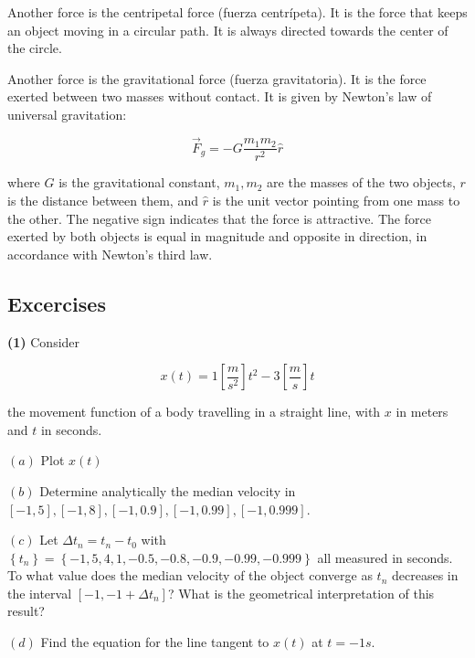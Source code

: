 \documentclass[12pt]{article}
\theoremstyle{definition}
\begin{document}
Another force is the centripetal force (fuerza centrípeta). It is the force
that keeps an object moving in a circular path. It is always directed towards
the center of the circle. 

Another force is the gravitational force (fuerza gravitatoria). 
It is the force exerted between two masses without contact. It is given by
Newton's law of universal gravitation: 

\begin{equation*}
    \vec{F}_g = - G \frac{m_1 m_2}{r^2} \hat{r}
\end{equation*}

where $G$ is the gravitational constant, $m_1, m_2$ are the masses of the two
objects, $r$ is the distance between them, and $\hat{r}$ is the unit vector
pointing from one mass to the other. The negative sign indicates that the force
is attractive. The force exerted by both objects is equal in magnitude and
opposite in direction, in accordance with Newton's third law.












\pagebreak


\subsection{Excercises}

\begin{shaded}
    \textbf{(1)} Consider 

    \begin{equation*}
        x(t) = 1 \left[ \frac{m}{s^2} \right] t^2 - 3 \left[ \frac{m}{s} \right]
        t
    \end{equation*}

    the movement function of a body travelling in a straight line, with $x$ 
    in meters and $t$ in seconds. 

    $(a)$ Plot $x(t)$

    $(b)$ Determine analytically the median velocity in $[-1, 5], [-1, 8], [-1,
    0.9], [-1, 0.99], [ -1, 0.999]$.

    $(c)$ Let $\Delta t_n = t_n - t_0$ with $\left\{ t_n \right\} = \left\{ -1,
    5, 4, 1, -0.5, -0.8, -0.9, - 0.99, -0.999\right\}  $ all measured in
    seconds. To what value does the median velocity of the object converge as
    $t_n$ decreases in the interval $[-1, -1 + \Delta t_n]$? What is the
    geometrical interpretation of this
    result? 

    $(d)$ Find the equation for the line tangent to $x(t)$ at $t = -1 s$.
\end{shaded}
\end{document}
